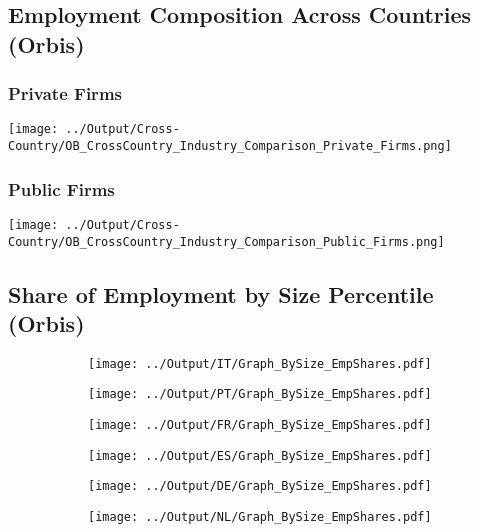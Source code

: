 \documentclass[12pt,notitlepage]{article}
\begin{document}
\clearpage

\subsection{Employment Composition Across Countries (Orbis)}

\subsubsection{Private Firms}
\begin{center}
 \texttt{[image: ../Output/Cross-Country/OB\_CrossCountry\_Industry\_Comparison\_Private\_Firms.png]}
\end{center}
\clearpage

\subsubsection{Public Firms}
\begin{center}
 \texttt{[image: ../Output/Cross-Country/OB\_CrossCountry\_Industry\_Comparison\_Public\_Firms.png]}
\end{center}

\clearpage





\subsection{Share of Employment by Size Percentile (Orbis)}
\begin{figure}[!htpb]
\centering
\begin{subfigure}{.49\textwidth}
    \centering
 \texttt{[image: ../Output/IT/Graph\_BySize\_EmpShares.pdf]}
\end{subfigure}%
\begin{subfigure}{.49\textwidth}
    \centering
 \texttt{[image: ../Output/PT/Graph\_BySize\_EmpShares.pdf]}
\end{subfigure}
\begin{subfigure}{.49\textwidth}
    \centering
 \texttt{[image: ../Output/FR/Graph\_BySize\_EmpShares.pdf]}
\end{subfigure}%
\begin{subfigure}{.49\textwidth}
    \centering
 \texttt{[image: ../Output/ES/Graph\_BySize\_EmpShares.pdf]}
\end{subfigure}
\begin{subfigure}{.49\textwidth}
    \centering
 \texttt{[image: ../Output/DE/Graph\_BySize\_EmpShares.pdf]}
\end{subfigure}
\begin{subfigure}{.49\textwidth}
    \centering
 \texttt{[image: ../Output/NL/Graph\_BySize\_EmpShares.pdf]}
\end{subfigure}
\end{figure}
\end{document}
